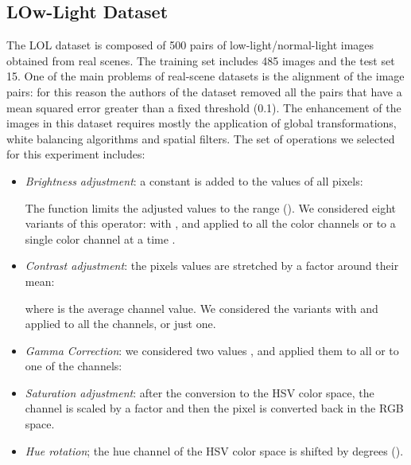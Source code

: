 \documentclass[3p,twocolumn]{elsarticle}
\begin{document}
\subsection{LOw-Light Dataset}
\label{subsec:LOL}
The LOL dataset \cite{Chen2018Retinex} is composed of 500 pairs of low-light/normal-light images obtained from real scenes. The training set includes 485 images and the test set 15. One of the main problems of real-scene datasets is the alignment of the image pairs: for this reason the authors of the dataset removed all the pairs that have a mean squared error greater than a fixed threshold (0.1).
The enhancement of the images in this dataset requires mostly the application of global transformations,
white balancing algorithms and spatial filters.  The set of operations  we selected for this experiment includes:
\begin{itemize}
    \item \emph{Brightness adjustment}: a constant  is added to the values of all pixels:
    
    The  function limits the adjusted values to the  range ().
    We considered eight variants of this operator:
    with , and applied to all the color channels or to a single color channel at a time .  
\item \emph{Contrast adjustment}: the pixels values are stretched by a factor  around their mean:
    
    where  is the average channel value. We considered the variants with  and applied to all the channels, or just one.
\item \emph{Gamma Correction}: we considered two values , and applied them to all or to one of the channels:

\item \emph{Saturation adjustment}: after the conversion to the HSV color space, the  channel is scaled by a factor  and then the pixel is converted back in the RGB space.
    \item \emph{Hue rotation}; the hue channel of the HSV color space is shifted by  degrees ().
    

\end{itemize}
\end{document}
